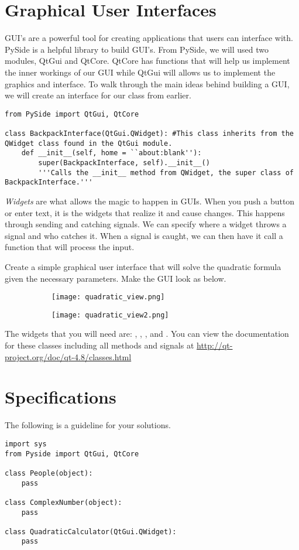 \section*{Graphical User Interfaces}

GUI's are a powerful tool for creating applications that users can interface with.
PySide is a helpful library to build GUI's.
From PySide, we will used two modules, QtGui and QtCore.
QtCore has functions that will help us implement the inner workings of our GUI while QtGui will allows us to implement the graphics and interface. 
To walk through the main ideas behind building a GUI, we will create an interface for our  class from earlier.

\begin{lstlisting}
from PySide import QtGui, QtCore

class BackpackInterface(QtGui.QWidget): #This class inherits from the QWidget class found in the QtGui module.
	def __init__(self, home = ``about:blank''):
		super(BackpackInterface, self).__init__() 
		'''Calls the __init__ method from QWidget, the super class of BackpackInterface.'''
\end{lstlisting}

\emph{Widgets} are what allows the magic to happen in GUIs.
When you push a button or enter text, it is the widgets that realize it and cause changes.
This happens through sending and catching signals.
We can specify where a widget throws a signal and who catches it.
When a signal is caught, we can then have it call a function that will process the input.


\begin{problem}
Create a simple graphical user interface that will solve the quadratic formula given the necessary parameters.
Make the GUI look as below.
\begin{figure}[H]
\centering
\begin{subfigure}[b]{.49\textwidth}
\texttt{[image: quadratic\_view.png]}
\end{subfigure}
\begin{subfigure}[b]{.49\textwidth}
\texttt{[image: quadratic\_view2.png]}
\end{subfigure}
\end{figure}
The widgets that you will need are: , , , and .
You can view the documentation for these classes including all methods and signals at \url{http://qt-project.org/doc/qt-4.8/classes.html}
\label{prob:quadCalc}
\end{problem}


\section*{Specifications}

The following is a guideline for your solutions.

\begin{lstlisting}
import sys
from Pyside import QtGui, QtCore

class People(object):
	pass
	
class ComplexNumber(object):
	pass
	
class QuadraticCalculator(QtGui.QWidget):
	pass
\end{lstlisting}

